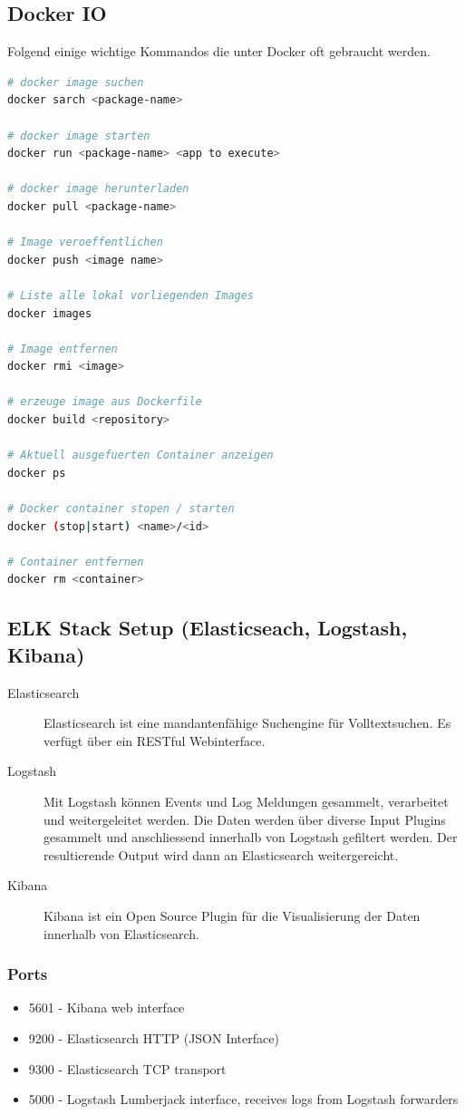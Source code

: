 \subsection{Docker IO}
Folgend einige wichtige Kommandos die unter Docker oft gebraucht werden.
\begin{lstlisting}[language=bash]
# docker image suchen
docker sarch <package-name>

# docker image starten
docker run <package-name> <app to execute>

# docker image herunterladen
docker pull <package-name>

# Image veroeffentlichen
docker push <image name>

# Liste alle lokal vorliegenden Images
docker images

# Image entfernen
docker rmi <image>

# erzeuge image aus Dockerfile
docker build <repository>

# Aktuell ausgefuerten Container anzeigen
docker ps

# Docker container stopen / starten
docker (stop|start) <name>/<id>

# Container entfernen
docker rm <container>
\end{lstlisting}

\subsection{ELK Stack Setup (Elasticseach, Logstash, Kibana)}
\begin{description}
	\item[Elasticsearch] Elasticsearch ist eine mandantenfähige Suchengine für Volltextsuchen. Es verfügt über ein RESTful Webinterface.
	\item[Logstash] Mit Logstash können Events und Log Meldungen gesammelt, verarbeitet und weitergeleitet werden. Die Daten werden über diverse Input Plugins gesammelt und anschliessend innerhalb von Logstash gefiltert werden. Der resultierende Output wird dann an Elasticsearch weitergereicht.
	\item[Kibana] Kibana ist ein Open Source Plugin für die Visualisierung der Daten innerhalb von Elasticsearch. 
\end{description}

\subsubsection{Ports}
\begin{itemize}
	\item 5601 - Kibana web interface
	\item 9200 - Elasticsearch HTTP (JSON Interface)
	\item 9300 - Elasticsearch TCP transport
	\item 5000 - Logstash Lumberjack interface, receives logs from Logstash forwarders
\end{itemize}

